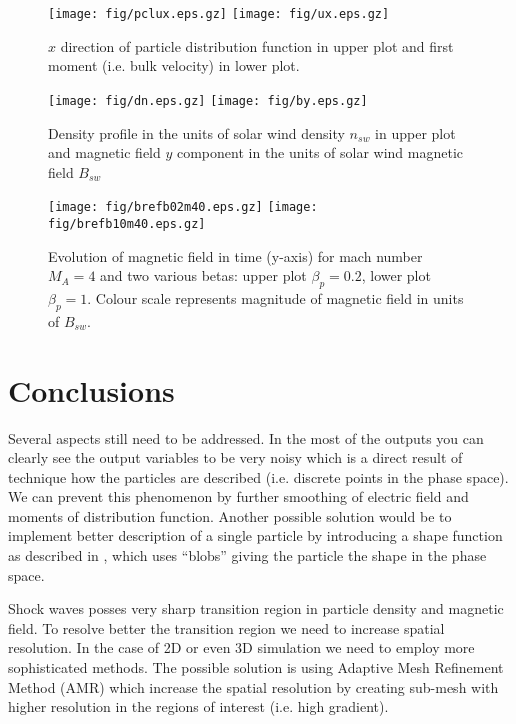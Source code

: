 \documentclass[oneside,branding,toc,article]{sat}
\begin{document}
\begin{figure}[!h]
  \centering
  \texttt{[image: fig/pclux.eps.gz]}
  \texttt{[image: fig/ux.eps.gz]}
  \caption{$x$ direction of particle distribution function in upper plot and
    first moment (i.e. bulk velocity) in lower plot. }
  \label{fig:dist}
\end{figure}

\begin{figure}[!h]
  \centering
  \texttt{[image: fig/dn.eps.gz]}
  \texttt{[image: fig/by.eps.gz]}
  \caption{Density profile in the units of solar wind density $n_{sw}$ in upper
    plot and magnetic field $y$ component in the units of solar wind magnetic
    field $B_{sw}$}
  \label{fig:dnby}
\end{figure}

\begin{figure}[!h]
  \centering
  \texttt{[image: fig/brefb02m40.eps.gz]}
  \texttt{[image: fig/brefb10m40.eps.gz]}
  \caption{Evolution of magnetic field in time (y-axis) for mach number $M_A =
    4$ and two various betas: upper plot $\beta_p = 0.2$, lower plot $\beta_p =
    1$. Colour scale represents magnitude of magnetic field in units of
    $B_{sw}$. }
  \label{fig:bref}
\end{figure}

\section{Conclusions}
Several aspects still need to be addressed.  In the most of the outputs you can
clearly see the output variables to be very noisy which is a direct result of
technique how the particles are described (i.e. discrete points in the phase
space).  We can prevent this phenomenon by further smoothing of electric field
and moments of distribution function.  Another possible solution would be to
implement better description of a single particle by introducing a shape
function as described in \cite{coppea96}, which uses ``blobs'' giving the
particle the shape in the phase space.

Shock waves posses very sharp transition region in particle density and
magnetic field.  To resolve better the transition region we need to increase
spatial resolution.  In the case of 2D or even 3D simulation we need to employ
more sophisticated methods.  The possible solution is using Adaptive Mesh
Refinement Method (AMR) which increase the spatial resolution by creating
sub-mesh with higher resolution in the regions of interest (i.e. high
gradient).
\end{document}
